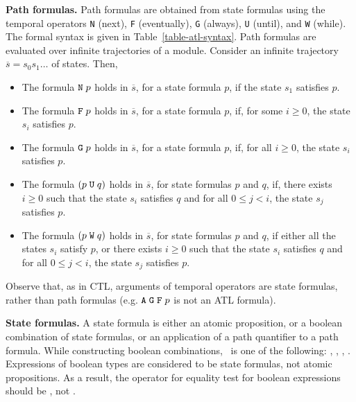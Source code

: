 \mypar
{\bf Path formulas.}
Path formulas are obtained from state formulas using the temporal
operators {\tt N} (next), {\tt F} (eventually), {\tt G} (always),
{\tt U} (until), and {\tt W} (while).
The formal syntax is given in Table~\ref{table-atl-syntax}.
Path formulas are evaluated over infinite trajectories of a module.
Consider an infinite trajectory $\overline{s}=s_0s_1\ldots$ of states.
Then,
\begin{itemize}
\item
The formula ${\tt N}\; p$ holds in $\overline{s}$, for a state formula $p$,
if the state $s_1$ satisfies $p$.
\item
The formula ${\tt F}\; p$ holds in $\overline{s}$, for a state formula $p$,
if, for some $i\geq 0$, the state $s_i$ satisfies $p$.
\item
The formula ${\tt G}\; p$ holds in $\overline{s}$, for a state formula $p$,
if, for all $i\geq 0$, the state $s_i$ satisfies $p$.
\item
The formula $(p\;{\tt U}\; q)$ holds in $\overline{s}$, for state 
formulas $p$ and $q$,
if, there exists $i\geq 0$ such that the state $s_i$ satisfies $q$
and for all $0\leq j<i$, the state $s_j$ satisfies $p$.
\item
The formula $(p\;{\tt W}\; q)$ holds in $\overline{s}$, for state 
formulas $p$ and $q$,
if either all the states $s_i$ satisfy $p$, or
there exists $i\geq 0$ such that the state $s_i$
satisfies $q$ and for all $0\leq j<i$, the state $s_j$ satisfies $p$.
\end{itemize}
Observe that, as in CTL, arguments of temporal operators are state formulas,
rather than path formulas
(e.g. ${\tt A}\;{\tt G}\;{\tt F}\; p$ is not an ATL formula).

\mypar
{\bf State formulas.}
A state formula is either an atomic proposition,
or a boolean combination of state formulas, or an application
of a path quantifier to a path formula.
While constructing boolean combinations,
\binbool\ is one of the following: \AND, \OR, \EQUIV, \IMPLY.
Expressions of boolean types are considered to be
state formulas, not atomic propositions. As a result, the operator for
equality test for boolean expressions should be \EQUIV, not \EQ.

